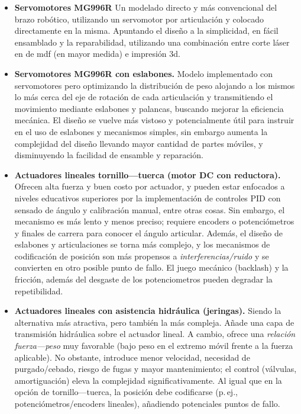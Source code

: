 \begin{itemize}
  \item\textbf{Servomotores MG996R} Un modelado directo y más convencional del brazo robótico, utilizando un servomotor por articulación y colocado directamente en la misma. Apuntando el diseño a la simplicidad, en fácil ensamblado y la reparabilidad, utilizando una combinación entre corte láser en de mdf (en mayor medida) e impresión 3d.
  
  \item\textbf{Servomotores MG996R con eslabones.} Modelo implementado con servomotores pero optimizando la distribución de peso alojando a los mismos lo más cerca del eje de rotación de cada articulación y transmitiendo el movimiento mediante eslabones y palancas, buscando mejorar la eficiencia mecánica. El diseño se vuelve más vistoso y potencialmente útil para instruir en el uso de eslabones y mecanismos simples, sin embargo aumenta la complejidad del diseño llevando mayor cantidad de partes móviles, y disminuyendo la facilidad de ensamble y reparación.

  \item\textbf{Actuadores lineales tornillo---tuerca (motor DC con reductora).} Ofrecen alta fuerza y buen costo por actuador, y pueden estar enfocados a niveles educativos superiores por la implementación de controles PID con sensado de ángulo y calibración manual, entre otras cosas. Sin embargo, el mecanismo es más lento y menos preciso; requiere encoders o potenciómetros y finales de carrera para conocer el ángulo articular. Además, el diseño de eslabones y articulaciones se torna más complejo,  y los mecanismos de codificación de posición son más propensos a \emph{interferencias/ruido} y se convierten en otro posible punto de fallo. El juego mecánico (backlash) y la fricción, además del desgaste de los potenciometros pueden degradar la repetibilidad.

  \item\textbf{Actuadores lineales con asistencia hidráulica (jeringas).} Siendo la alternativa más atractiva, pero también la más compleja. Añade una capa de transmisión hidráulica sobre el actuador lineal. A cambio, ofrece una \emph{relación fuerza---peso} muy favorable (bajo peso en el extremo móvil frente a la fuerza aplicable). No obstante, introduce menor velocidad, necesidad de purgado/cebado, riesgo de fugas y mayor mantenimiento; el control (válvulas, amortiguación) eleva la complejidad significativamente. Al igual que en la opción de tornillo---tuerca, la posición debe codificarse (p.\,ej., potenciómetros/encoders lineales), añadiendo potenciales puntos de fallo.
\end{itemize}

